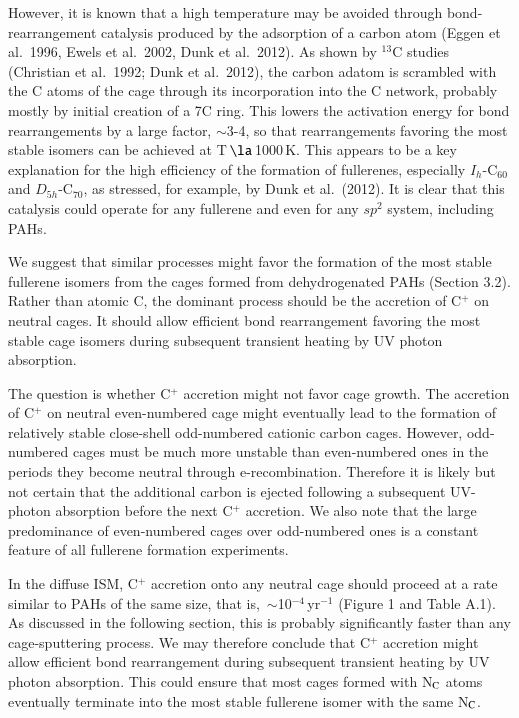 \documentclass{aa}
\begin{document}
However, it is known that a high temperature may be avoided through bond-rearrangement catalysis produced by the adsorption of a carbon atom (Eggen et al.\ 1996, Ewels et al.\ 2002, Dunk et al.\ 2012). As shown by $^{13}$C studies (Christian et al.\ 1992; Dunk et al.\ 2012), the carbon adatom is scrambled with the C atoms of the cage through its incorporation into the C network, probably mostly by initial creation of a 7C ring. This lowers the activation energy for bond rearrangements by a large factor, $\sim$3-4, so that rearrangements favoring the most stable isomers can be achieved at T\,$\la$\,1000\,K. This appears to be a key explanation for the high efficiency of the formation of fullerenes, especially $I_h$-C$_{60}$ 
and $D_{5h}$-C$_{70}$, as stressed, for example, by Dunk et al.\ (2012). It is clear that this catalysis could operate for any fullerene and even for any $sp^2$ system, including PAHs.

We suggest that similar processes might favor the formation of the most stable fullerene isomers from the cages formed from dehydrogenated PAHs (Section 3.2). Rather than atomic C, the dominant process should be the accretion of C$^+$ on neutral cages. It should allow efficient bond rearrangement favoring the most stable cage isomers during subsequent transient 
heating by UV photon absorption.

The question is whether C$^+$ accretion might not  favor cage growth. The accretion of C$^+$ on neutral even-numbered cage might eventually lead to the formation of relatively stable close-shell odd-numbered cationic carbon cages.  However, odd-numbered cages must be much more unstable than 
even-numbered ones in the periods they become neutral through e-recombination. Therefore it is likely but not certain that the additional carbon is ejected following a subsequent UV-photon  absorption before the next C$^+$ accretion. We also note that the large predominance of even-numbered cages over odd-numbered ones is a constant feature of all fullerene formation experiments. 

In the diffuse ISM, C$^+$ accretion onto any neutral cage should proceed at a rate similar to PAHs of the same size, that is,\ $\sim$10$^{-4}$\,yr$^{-1}$ (Figure 1 and Table A.1). As discussed in the following section, this is probably significantly faster than any cage-sputtering process. We may therefore conclude that C$^+$ accretion might allow efficient bond rearrangement during subsequent transient heating by UV photon absorption. This could ensure that most cages formed with N$_{\rm C}$ atoms eventually terminate into the most stable fullerene isomer with the same N$_{\rm C}$.
\end{document}
